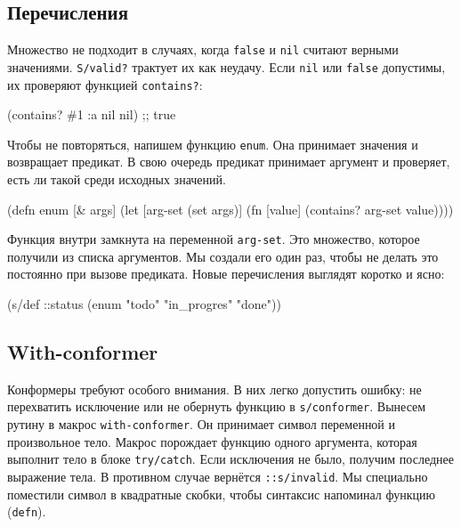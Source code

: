 \subsection{Перечисления}


Множество не подходит в случаях, когда \verb|false| и \verb|nil| считают
верными значениями. \verb|S/valid?| трактует их как неудачу. Если \verb|nil|
или \verb|false| допустимы, их проверяют функцией \verb|contains?|:

\begin{english}
  \begin{clojure}
(contains? #{1 :a nil} nil) ;; true
  \end{clojure}
\end{english}

Чтобы не повторяться, напишем функцию \verb|enum|. Она принимает значения и
возвращает предикат. В свою очередь предикат принимает аргумент и проверяет,
есть ли такой среди исходных значений.

\begin{english}
  \begin{clojure}
(defn enum [& args]
  (let [arg-set (set args)]
    (fn [value]
      (contains? arg-set value))))
  \end{clojure}
\end{english}

Функция внутри замкнута на переменной \verb|arg-set|. Это множество, которое
получили из списка аргументов. Мы создали его один раз, чтобы не делать это
постоянно при вызове предиката. Новые перечисления выглядят коротко и ясно:

\begin{english}
  \begin{clojure}
(s/def ::status
  (enum "todo" "in_progres" "done"))
  \end{clojure}
\end{english}

\subsection{With-conformer}


Конформеры требуют особого внимания. В них легко допустить ошибку: не
перехватить исключение или не обернуть функцию в \verb|s/conformer|. Вынесем
рутину в макрос \verb|with-conformer|. Он принимает символ переменной и
произвольное тело. Макрос порождает функцию одного аргумента, которая выполнит
тело в блоке \verb|try/catch|. Если исключения не было, получим последнее
выражение тела. В противном случае вернётся \verb|::s/invalid|. Мы
специально поместили символ в квадратные скобки, чтобы синтаксис напоминал
функцию (\verb|defn|).

